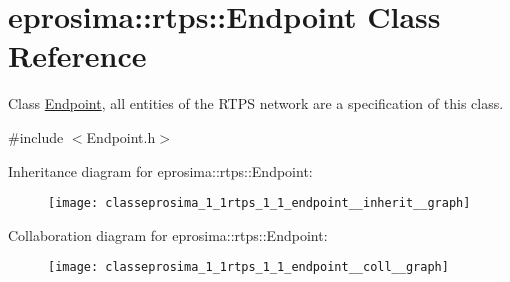 \hypertarget{classeprosima_1_1rtps_1_1_endpoint}{\section{eprosima\-:\-:rtps\-:\-:\-Endpoint \-Class \-Reference}
\label{classeprosima_1_1rtps_1_1_endpoint}
}


\-Class \hyperlink{classeprosima_1_1rtps_1_1_endpoint}{\-Endpoint}, all entities of the \-R\-T\-P\-S network are a specification of this class.  




{\ttfamily \#include $<$\-Endpoint.\-h$>$}



\-Inheritance diagram for eprosima\-:\-:rtps\-:\-:\-Endpoint\-:\nopagebreak
\begin{figure}[H]
\begin{center}
\leavevmode
\texttt{[image: classeprosima\_1\_1rtps\_1\_1\_endpoint\_\_inherit\_\_graph]}
\end{center}
\end{figure}


\-Collaboration diagram for eprosima\-:\-:rtps\-:\-:\-Endpoint\-:\nopagebreak
\begin{figure}[H]
\begin{center}
\leavevmode
\texttt{[image: classeprosima\_1\_1rtps\_1\_1\_endpoint\_\_coll\_\_graph]}
\end{center}
\end{figure}
